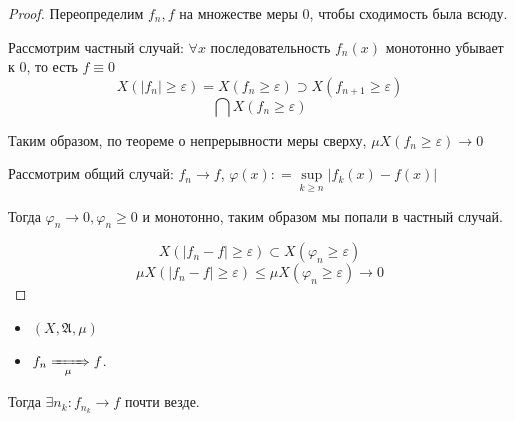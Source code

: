 \begin{proof}
    Переопределим \(f_n, f\) на множестве меры \(0\), чтобы сходимость была всюду.

    Рассмотрим частный случай: \(\forall x\) последовательность \(f_n(x)\) монотонно убывает к \(0\), то есть \(f\equiv 0\)
    \[X(|f_n| \geq \varepsilon) = X(f_n \geq \varepsilon) \supset X(f_{n+1} \geq \varepsilon)\]
    \[\bigcap X(f_n \geq \varepsilon)\]

    Таким образом, по теореме о непрерывности меры сверху, \(\mu X(f_n \geq \varepsilon) \to 0\)

    Рассмотрим общий случай: \(f_n \to f\), \(\varphi(x) : = \sup\limits_{k \geq n} |f_k(x) - f(x)|\)

    Тогда \(\varphi_n \to 0, \varphi_n \geq 0\) и монотонно, таким образом мы попали в частный случай.

    \[X(|f_n - f| \geq \varepsilon) \subset X(\varphi_n \geq \varepsilon)\]
    \[\mu X(|f_n - f| \geq \varepsilon) \leq \mu X(\varphi_n \geq \varepsilon) \to 0\]
\end{proof}

\begin{theorem}[Рисс]\itemfix
    \begin{itemize}
        \item \((X, \mathfrak{A}, \mu)\)
        \item \(f_n \xRightarrow[\mu]{\qquad} f\).
    \end{itemize}
    Тогда \(\exists n_k : f_{n_k} \to f\) почти везде.
\end{theorem}

